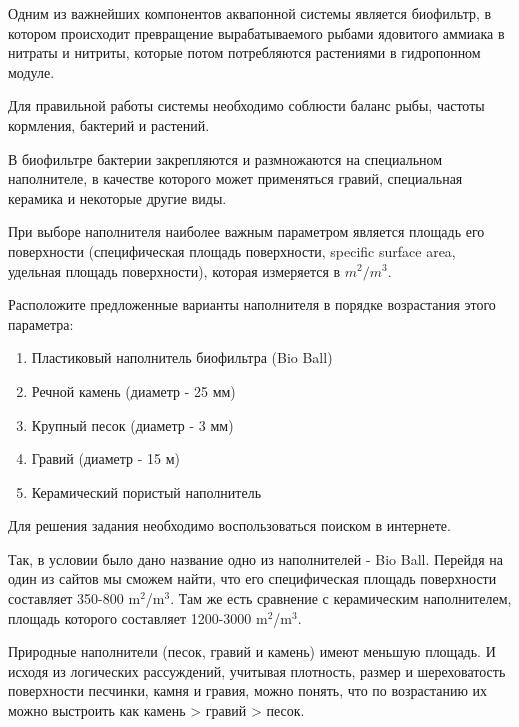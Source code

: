 
Одним из важнейших компонентов аквапонной системы является биофильтр, в котором происходит превращение вырабатываемого рыбами ядовитого аммиака в нитраты и нитриты, которые потом потребляются растениями в гидропонном модуле.

Для правильной работы системы необходимо соблюсти баланс рыбы, частоты кормления,  бактерий и растений.

В биофильтре бактерии закрепляются и размножаются на специальном наполнителе, в качестве которого может применяться гравий, специальная керамика и некоторые другие виды.

При выборе наполнителя наиболее важным параметром является площадь его поверхности 
(специфическая площадь поверхности, specific surface area, удельная площадь поверхности), 
которая измеряется в $m^2/m^3$.

Расположите предложенные варианты наполнителя в порядке возрастания этого параметра:

\begin{enumerate}
    \item Пластиковый наполнитель биофильтра (Bio Ball)
    \item Речной камень (диаметр - 25 мм)
    \item Крупный песок (диаметр - 3 мм)
    \item Гравий (диаметр - 15 м) 
    \item Керамический пористый наполнитель
\end{enumerate}

\explanationSection

Для решения задания необходимо воспользоваться поиском в интернете.

Так, в условии было дано название одно из наполнителей - Bio Ball. Перейдя на один из сайтов мы сможем найти, 
что его специфическая площадь поверхности составляет 350-800 m$^2$/m$^3$. Там же есть сравнение с керамическим 
наполнителем, площадь которого составляет  1200-3000 m$^2$/m$^3$.

Природные наполнители (песок, гравий и камень) имеют меньшую площадь. И исходя из логических рассуждений, 
учитывая плотность, размер и шереховатость поверхности песчинки, камня и гравия, можно понять, что по возрастанию их можно выстроить как камень > гравий > песок.

